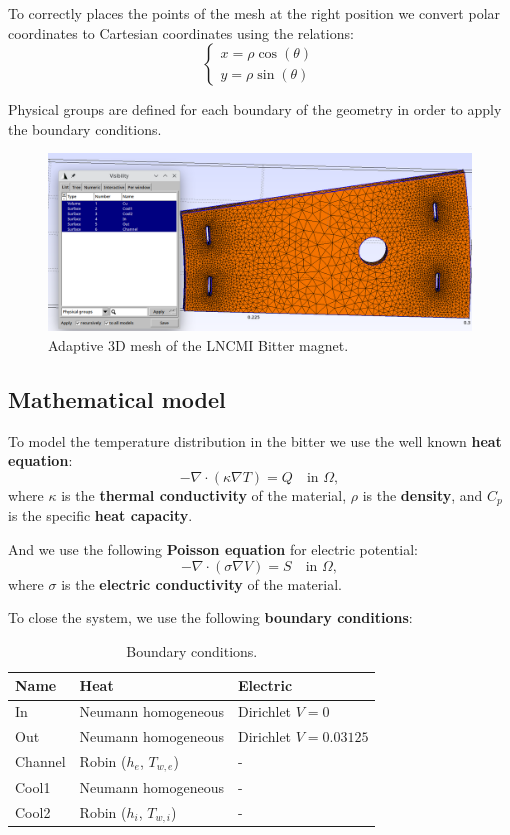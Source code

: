 \documentclass[12pt]{article}
\begin{document}
To correctly places the points of the mesh at the right position we convert polar
coordinates to Cartesian coordinates using the relations:
$$
\begin{cases}
  x = \rho \cos(\theta) \\
  y = \rho \sin(\theta)
\end{cases}
$$

Physical groups are defined for each boundary of the geometry in order to apply the boundary conditions.

\begin{figure}[H]
  \centering
  \includegraphics[width=\textwidth]{images/bitter_mesh.png}
  \caption{Adaptive 3D mesh of the LNCMI Bitter magnet.}
\end{figure}

\subsection{Mathematical model}
To model the temperature distribution in the bitter we use the well known \textbf{heat equation}:
$$
-\nabla \cdot (\kappa \nabla T) = Q \quad \text{in } \Omega,
$$
where $\kappa$ is the \textbf{thermal conductivity} of the material, $\rho$ is
the \textbf{density}, and $C_p$ is the specific \textbf{heat capacity}.

\noindent And we use the following \textbf{Poisson equation} for electric potential:
$$
- \nabla \cdot (\sigma \nabla V) = S \quad \text{in } \Omega,
$$
where $\sigma$ is the \textbf{electric conductivity} of the material.

To close the system, we use the following \textbf{boundary conditions}:

\begin{table}[H]
  \centering
  \begin{tabular}{|l|l|l|}
    \hline
    \textbf{Name} & \textbf{Heat} & \textbf{Electric} \\ \hline
    In & Neumann homogeneous & Dirichlet $V = 0$ \\ \hline
    Out & Neumann homogeneous & Dirichlet $V = 0.03125$ \\ \hline
    Channel & Robin ($h_e$, $T_{w,e}$) & - \\ \hline
    Cool1 & Neumann homogeneous & - \\ \hline
    Cool2 & Robin ($h_i$, $T_{w,i}$) & - \\ \hline
  \end{tabular}
  \caption{Boundary conditions.}
  \label{tab:boundary_conditions}
\end{table}
\end{document}
